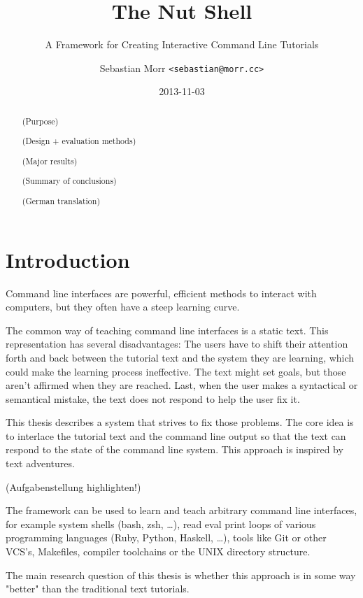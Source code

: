 \documentclass[twoside,blue]{tubsreprt}
\title{The Nut Shell}
\subtitle{A Framework for Creating Interactive Command Line Tutorials}
\author{Sebastian Morr \texttt{<sebastian@morr.cc>}}
\date{2013-11-03}
\begin{document}
\maketitle[image,logo=right]
\makebackpage[trisec]

\begin{abstract}
(Purpose)

(Design + evaluation methods)

(Major results)

(Summary of conclusions)

\vspace{8em}

(German translation)
\end{abstract}

\setcounter{tocdepth}{0}
\tableofcontents

\chapter{Introduction}

Command line interfaces are powerful, efficient methods to interact with computers, but they often have a steep learning curve.

The common way of teaching command line interfaces is a static text. This representation has several disadvantages: The users have to shift their attention forth and back between the tutorial text and the system they are learning, which could make the learning process ineffective. The text might set goals, but those aren't affirmed when they are reached. Last, when the user makes a syntactical or semantical mistake, the text does not respond to help the user fix it.

This thesis describes a system that strives to fix those problems. The core idea is to interlace the tutorial text and the command line output so that the text can respond to the state of the command line system. This approach is inspired by text adventures.

(Aufgabenstellung highlighten!)

The framework can be used to learn and teach arbitrary command line interfaces, for example system shells (bash, zsh, …), read eval print loops of various programming languages (Ruby, Python, Haskell, …), tools like Git or other VCS's, Makefiles, compiler toolchains or the UNIX directory structure.

The main research question of this thesis is whether this approach is in some way "better" than the traditional text tutorials.
\end{document}
